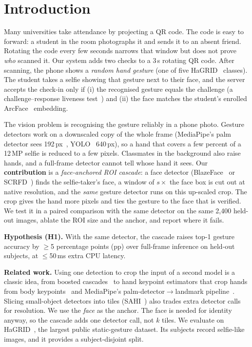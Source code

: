 \section{Introduction}
\label{sec:intro}

Many universities take attendance by projecting a QR code. The code is easy to forward: a student in the room
photographs it and sends it to an absent friend. Rotating the code every few seconds narrows that window but does
not prove \emph{who} scanned it. Our system adds two checks to a 3\,s rotating QR code. After scanning, the phone
shows a \emph{random hand gesture} (one of five HaGRID~\cite{hagrid} classes). The student takes a selfie showing
that gesture next to their face, and the server accepts the check-in only if
(i) the recognised gesture equals the challenge (a challenge--response liveness test~\cite{iso30107}) and
(ii) the face matches the student's enrolled ArcFace~\cite{arcface} embedding.

The vision problem is recognising the gesture reliably in a phone photo. Gesture detectors work on a downscaled
copy of the whole frame (MediaPipe's palm detector sees 192\,px~\cite{mphands}, YOLO~\cite{yolov8} 640\,px), so a
hand that covers a few percent of a 12\,MP selfie is reduced to a few pixels. Classmates in the background also
raise hands, and a full-frame detector cannot tell whose hand it sees.
Our \textbf{contribution} is a \emph{face-anchored ROI cascade}: a face detector (BlazeFace~\cite{blazeface} or
SCRFD~\cite{scrfd}) finds the selfie-taker's face, a window of $s\times$ the face box is cut out at native
resolution, and the \emph{same} gesture detector runs on this up-scaled crop. The crop gives the hand more pixels
and ties the gesture to the face that is verified. We test it in a paired comparison with the same detector on
the same 2,400 held-out images, ablate the ROI size and the anchor, and report where it fails.

\noindent\textbf{Hypothesis (H1).} With the same detector, the cascade raises top-1 gesture accuracy by
$\geq$5 percentage points (pp) over full-frame inference on held-out subjects, at $\leq$50\,ms extra CPU latency.

\noindent\textbf{Related work.} Using one detection to crop the input of a second model is a classic idea, from
boosted cascades~\cite{violajones} to hand keypoint estimators that crop hands from body keypoints~\cite{simon2017hand}
and MediaPipe's palm-detector$\rightarrow$landmark pipeline~\cite{mphands,mediapipe}. Slicing small-object
detectors into tiles (SAHI~\cite{sahi}) also trades extra detector calls for resolution. We use the \emph{face}
as the anchor. The face is needed for identity anyway, so the cascade adds one detector call, not $k$ tiles. We
evaluate on HaGRID~\cite{hagrid,hagridv2}, the largest public static-gesture dataset. Its subjects record
selfie-like images, and it provides a subject-disjoint split.

